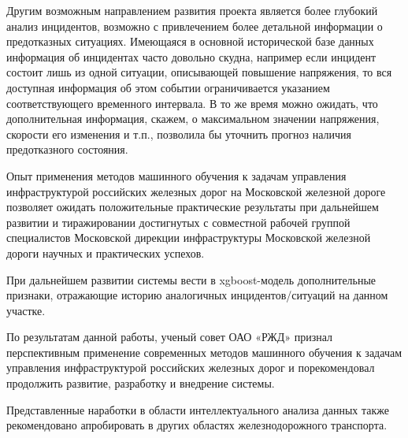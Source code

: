 Другим возможным направлением развития проекта является более глубокий анализ инцидентов, возможно с привлечением более детальной информации о предотказных ситуациях. Имеющаяся в основной исторической базе данных информация об инцидентах часто довольно скудна, например если инцидент состоит лишь из одной ситуации, описывающей повышение напряжения, то вся доступная информация об этом событии ограничивается указанием соответствующего временного интервала. В то же время можно ожидать, что дополнительная информация, скажем, о максимальном значении напряжения, скорости его изменения и т.п., позволила бы уточнить прогноз наличия предотказного состояния.


Опыт применения методов машинного обучения к задачам управления инфраструктурой российских железных дорог на Московской железной дороге позволяет ожидать положительные практические результаты при дальнейшем развитии и тиражировании достигнутых с совместной рабочей группой специалистов Московской дирекции инфраструктуры Московской железной дороги научных и практических успехов.

При дальнейшем развитии системы вести в xgboost-модель дополнительные признаки, отражающие историю аналогичных инцидентов/ситуаций на данном участке.

По результатам данной работы, ученый совет ОАО «РЖД» признал перспективным применение современных методов машинного обучения к задачам управления инфраструктурой российских железных дорог и порекомендовал продолжить развитие, разработку и внедрение системы. 

Представленные наработки в области интеллектуального анализа данных также рекомендовано апробировать в других областях железнодорожного транспорта.
